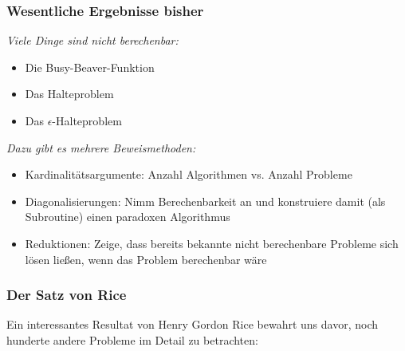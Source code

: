 \documentclass[onlymath]{beamer}
\begin{document}
\maketitle


\begin{frame}\frametitle{Wesentliche Ergebnisse bisher}

\emph{Viele Dinge sind nicht berechenbar:}
\begin{itemize}
\item Die Busy-Beaver-Funktion
\item Das Halteproblem
\item Das $\epsilon$-Halteproblem
\end{itemize}
\bigskip

\emph{Dazu gibt es mehrere Beweismethoden:}
\begin{itemize}
\item \alert{Kardinalitätsargumente:} Anzahl Algorithmen vs. Anzahl Probleme
\item \alert{Diagonalisierungen:} Nimm Berechenbarkeit an und konstruiere damit (als Subroutine) einen paradoxen Algorithmus
\item \alert{Reduktionen:} Zeige, dass bereits bekannte nicht berechenbare Probleme sich lösen ließen, wenn das Problem berechenbar wäre
\end{itemize}

\end{frame}


\begin{frame}\frametitle{Der Satz von Rice}

Ein interessantes Resultat von Henry Gordon Rice bewahrt uns davor, noch hunderte andere Probleme im Detail zu betrachten:\medskip

\bigskip\pause



\end{frame}
\end{document}
